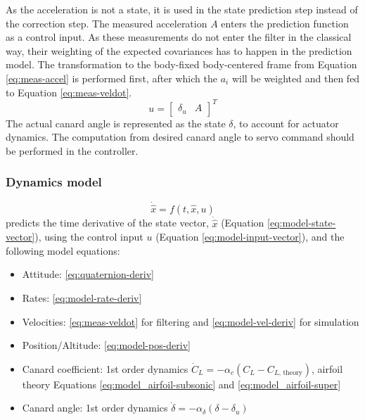 As the acceleration is not a state, %
it is used in the state prediction step instead of the correction step. 
The measured acceleration $A$ enters the prediction function as a control input.
As these measurements do not enter the filter in the classical way, their weighting of the expected covariances has to happen in the prediction model.
The transformation to the body-fixed body-centered frame from Equation \ref{eq:meas-accel} is performed first, after which the $a_i$ will be weighted and then fed to Equation \ref{eq:meas-veldot}.
\begin{equation}
    u =  \begin{bmatrix}
    \delta_u & A
    \end{bmatrix}^T
    \label{eq:model-input-vector}
\end{equation}
The actual canard angle is represented as the state $\delta$, to account for actuator dynamics.
The computation from desired canard angle to servo command should be performed in the controller. 

\subsubsection{Dynamics model}
\begin{equation}
    \dot{\hat x} = f(t, \hat x, u) \nonumber
\end{equation}
predicts the time derivative of the state vector, $\dot{\hat x}$ (Equation \ref{eq:model-state-vector}), using the control input $u$ (Equation \ref{eq:model-input-vector}), and the following model equations:
\begin{itemize}
    \item Attitude: \ref{eq:quaternion-deriv}
    \item Rates: \ref{eq:model-rate-deriv}
    \item Velocities: \ref{eq:meas-veldot} for filtering and \ref{eq:model-vel-deriv} for simulation
    \item Position/Altitude: \ref{eq:model-pos-deriv}
    \item Canard coefficient: 1st order dynamics $\dot C_L = -\alpha_c (C_L - C_{L\text{, theory}})$, airfoil theory Equations \ref{eq:model_airfoil-subsonic} and \ref{eq:model_airfoil-super}
    \item Canard angle: 1st order dynamics $\dot \delta = -\alpha_\delta (\delta - \delta_u)$
\end{itemize}

